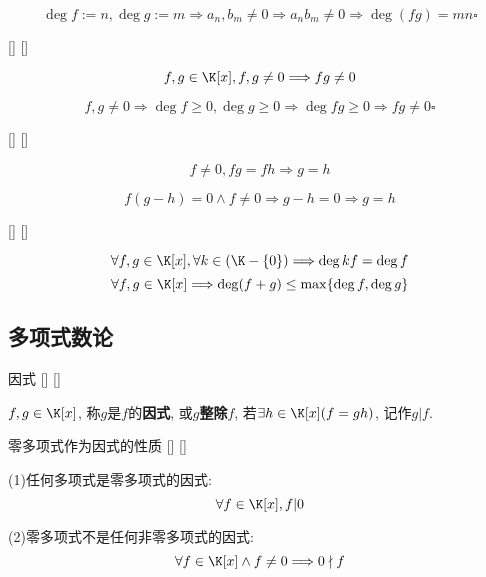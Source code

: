 \documentclass[UTF8]{ctexart}
\begin{document}
        \begin{prf}
			\[\deg f:=n, \deg g:=m\Longrightarrow a_n, b_m\neq 0\Longrightarrow a_n b_m\neq 0\Longrightarrow\deg(fg)=mn\square\]
        \end{prf}
        
		\begin{ppt}
			[]
			{}
			[]
			[]

			\[f,g\in\K[x], f,g\neq 0\Longrightarrow fg\neq 0\]
		\end{ppt}
  
        \begin{prf}
			\[f,g\neq 0\Longrightarrow\deg f\geq 0, \deg g\geq 0\Longrightarrow \deg fg\geq 0\Longrightarrow fg\neq 0\square\]
        \end{prf}
        
		\begin{ppt}
			[]
			{}
			[]
			[]
			
			\[f\neq0, fg=fh\Longrightarrow g=h\]
		\end{ppt}
  
        \begin{prf}
			\[f(g-h)=0\wedge f\neq 0\Longrightarrow g-h=0\Longrightarrow g=h\]
        \end{prf}
        
		\begin{ppt}
			[]
			{}
			[]
			[]
			
			\[\forall f,g\in\K[x], \forall k\in(\K-\{0\})\Longrightarrow\deg kf=\deg f\]
			\[\forall f,g\in\K[x]\Longrightarrow\deg (f+g)\leq\max\{\deg f,\deg g\}\]
		\end{ppt}
		
	\subsection{多项式数论}

		\begin{dfn}
			[]
			{因式}
			[]
			[]
			
			$f,g\in\K[x]$, 称$g$是$f$的\textbf{因式}, 或$g$\textbf{整除}$f$, 若$\exists h\in\K[x](f=gh)$, 记作$g|f$. 
		\end{dfn}
		
		\begin{ppt}
			[]
			{零多项式作为因式的性质}
			[]
			[]
			
			(1)任何多项式是零多项式的因式: 
			\[\forall f\in\K[x], f|0\]

			(2)零多项式不是任何非零多项式的因式: 
			\[\forall f\in\K[x]\wedge f\neq 0\Longrightarrow 0\nmid f\]
		\end{ppt}
\end{document}
